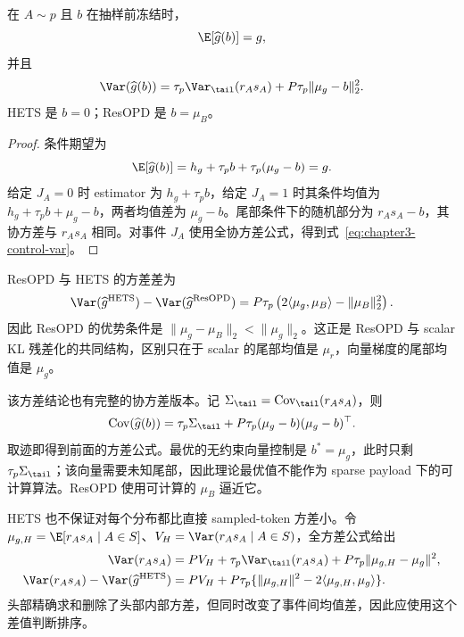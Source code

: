 \begin{theorem}
\label{thm:chapter3-resopd}
在 $A\sim p$ 且 $b$ 在抽样前冻结时，
\[
 \E[\widehat g(b)]=g,
\]
并且
\begin{equation}
 \Var(\widehat g(b))
 =\tau_p\Var_{\tail}(r_As_A)
  +P\tau_p\lVert\mu_g-b\rVert_2^2.
 \label{eq:chapter3-control-var}
\end{equation}
HETS 是 $b=0$；ResOPD 是 $b=\mu_B$。
\end{theorem}

\begin{proof}
条件期望为
\[
 \E[\widehat g(b)]
 =h_g+\tau_pb+\tau_p(\mu_g-b)=g.
\]
给定 $J_A=0$ 时 estimator 为 $h_g+\tau_pb$，给定 $J_A=1$ 时其条件均值为 $h_g+\tau_pb+\mu_g-b$，两者均值差为 $\mu_g-b$。尾部条件下的随机部分为 $r_As_A-b$，其协方差与 $r_As_A$ 相同。对事件 $J_A$ 使用全协方差公式，得到式~\eqref{eq:chapter3-control-var}。
\end{proof}

ResOPD 与 HETS 的方差差为
\begin{equation}
 \Var(\widehat g^{\mathrm{HETS}})-\Var(\widehat g^{\mathrm{ResOPD}})
 =P\tau_p\left(2\langle\mu_g,\mu_B\rangle-\lVert\mu_B\rVert_2^2\right).
 \label{eq:chapter3-hets-resopd-gap}
\end{equation}
因此 ResOPD 的优势条件是
$\lVert\mu_g-\mu_B\rVert_2<\lVert\mu_g\rVert_2$。这正是 ResOPD 与 scalar KL 残差化的共同结构，区别只在于 scalar 的尾部均值是 $\mu_r$，向量梯度的尾部均值是 $\mu_g$。

该方差结论也有完整的协方差版本。记 $\Sigma_{\tail}=\operatorname{Cov}_{\tail}(r_As_A)$，则
\[
 \operatorname{Cov}(\widehat g(b))
 =\tau_p\Sigma_{\tail}
  +P\tau_p(\mu_g-b)(\mu_g-b)^\top.
\]
取迹即得到前面的方差公式。最优的无约束向量控制是 $b^*=\mu_g$，此时只剩 $\tau_p\Sigma_{\tail}$；该向量需要未知尾部，因此理论最优值不能作为 sparse payload 下的可计算算法。ResOPD 使用可计算的 $\mu_B$ 逼近它。

HETS 也不保证对每个分布都比直接 sampled-token 方差小。令 $\mu_{g,H}=\E[r_As_A\mid A\in S]$、$V_H=\Var(r_As_A\mid A\in S)$，全方差公式给出
\begin{align*}
 \Var(r_As_A)&=PV_H+\tau_p\Var_{\tail}(r_As_A)
 +P\tau_p\lVert\mu_{g,H}-\mu_g\rVert^2,\\
 \Var(r_As_A)-\Var(\widehat g^{\mathrm{HETS}})
 &=PV_H+P\tau_p\{\lVert\mu_{g,H}\rVert^2
 -2\langle\mu_{g,H},\mu_g\rangle\}.
\end{align*}
头部精确求和删除了头部内部方差，但同时改变了事件间均值差，因此应使用这个差值判断排序。

